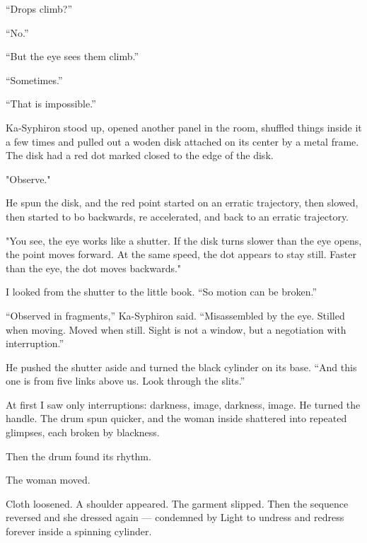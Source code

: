 ``Drops climb?''\par

``No.''\par

``But the eye sees them climb.''\par

``Sometimes.''\par

``That is impossible.''\par

Ka-Syphiron stood up, opened another panel in the room, shuffled things inside it a few times and pulled out a woden disk attached on its center by a metal frame. The disk had a red dot marked closed to the edge of the disk.  

"Observe."

He spun the disk, and the red point started on an erratic trajectory, then slowed, then started to bo backwards, re accelerated, and back to an erratic trajectory.

"You see, the eye works like a shutter. If the disk turns slower than the eye opens, the point moves forward. At the same speed, the dot appears to stay still. Faster than the eye, the dot moves backwards."

I looked from the shutter to the little book. ``So motion can be broken.''\par

``Observed in fragments,'' Ka-Syphiron said. ``Misassembled by the eye. Stilled when moving. Moved when still. Sight is not a window, but a negotiation with interruption.''\par

He pushed the shutter aside and turned the black cylinder on its base. ``And this one is from five links above us. Look through the slits.''\par

At first I saw only interruptions: darkness, image, darkness, image. He turned the handle. The drum spun quicker, and the woman inside shattered into repeated glimpses, each broken by blackness.\par

Then the drum found its rhythm.\par

The woman moved.\par

Cloth loosened. A shoulder appeared. The garment slipped. Then the sequence reversed and she dressed again --- condemned by Light to undress and redress forever inside a spinning cylinder.\par

